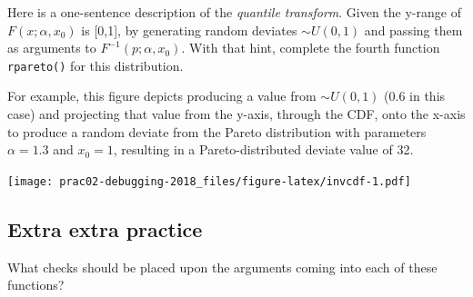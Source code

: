 \documentclass[]{article}
\begin{document}
Here is a one-sentence description of the \emph{quantile transform}.
Given the y-range of \(F(x; \alpha, x_0)\) is {[}0,1{]}, by generating
random deviates \(\sim U(0,1)\) and passing them as arguments to
\(F^{-1}(p; \alpha, x_0)\). With that hint, complete the fourth function
\texttt{rpareto()} for this distribution.

For example, this figure depicts producing a value from \(\sim U(0,1)\)
(0.6 in this case) and projecting that value from the y-axis, through
the CDF, onto the x-axis to produce a random deviate from the Pareto
distribution with parameters \(\alpha=1.3\) and \(x_0=1\), resulting in
a Pareto-distributed deviate value of 32.

\texttt{[image: prac02-debugging-2018\_files/figure-latex/invcdf-1.pdf]}

\subsection{Extra extra practice}\label{extra-extra-practice}

What checks should be placed upon the arguments coming into each of
these functions?
\end{document}
